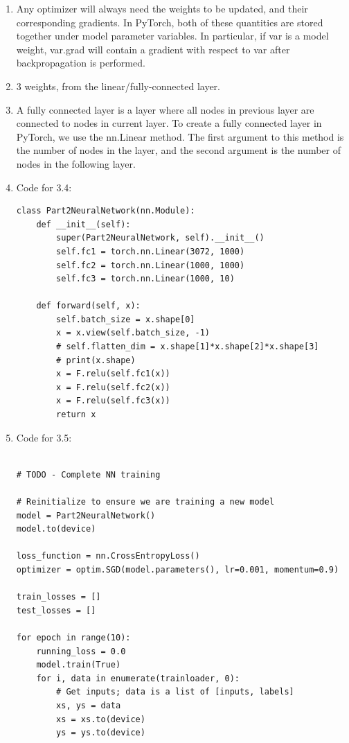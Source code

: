 \documentclass[submit]{harvardml}
\begin{document}
\begin{enumerate}
    \item Any optimizer will always need the weights to be updated, and their corresponding gradients. In PyTorch, both of these quantities are stored together under model parameter variables. In particular, if var is a model weight, var.grad will contain a gradient with respect to var after backpropagation is performed.
    \item 3 weights, from the linear/fully-connected layer.
    \item A fully connected layer is a layer where all nodes in previous layer are connected to nodes in current layer. To create a fully connected layer in PyTorch, we use the nn.Linear method. The first argument to this method is the number of nodes in the layer, and the second argument is the number of nodes in the following layer.
    \item Code for 3.4:
\begin{lstlisting}
class Part2NeuralNetwork(nn.Module):
    def __init__(self):
        super(Part2NeuralNetwork, self).__init__()
        self.fc1 = torch.nn.Linear(3072, 1000) 
        self.fc2 = torch.nn.Linear(1000, 1000) 
        self.fc3 = torch.nn.Linear(1000, 10) 
    
    def forward(self, x):
        self.batch_size = x.shape[0]
        x = x.view(self.batch_size, -1)
        # self.flatten_dim = x.shape[1]*x.shape[2]*x.shape[3]
        # print(x.shape)
        x = F.relu(self.fc1(x))
        x = F.relu(self.fc2(x))
        x = F.relu(self.fc3(x))
        return x
\end{lstlisting}
    
\item Code for 3.5:
\begin{lstlisting}

# TODO - Complete NN training

# Reinitialize to ensure we are training a new model
model = Part2NeuralNetwork()
model.to(device)

loss_function = nn.CrossEntropyLoss()
optimizer = optim.SGD(model.parameters(), lr=0.001, momentum=0.9)

train_losses = []
test_losses = []

for epoch in range(10):
    running_loss = 0.0
    model.train(True)
    for i, data in enumerate(trainloader, 0):
        # Get inputs; data is a list of [inputs, labels]
        xs, ys = data
        xs = xs.to(device)
        ys = ys.to(device)


\end{lstlisting}
\end{enumerate}
\end{document}
